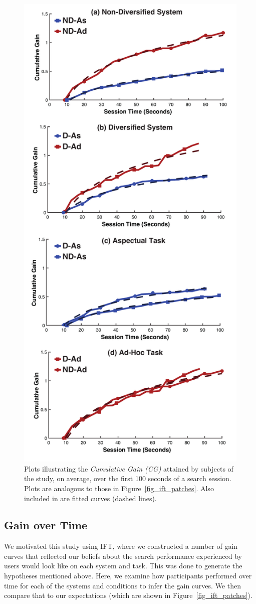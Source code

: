 \begin{figure}[t!]
\includegraphics[width=0.8\linewidth]{figures/cg-new.pdf}
\caption{Plots illustrating the \emph{Cumulative Gain (CG)} attained by subjects of the study, on average, over the first 100 seconds of a search session. Plots are analogous to those in Figure~\ref{fig_ift_patches}. Also included in are fitted curves (dashed lines).} \label{fig_cg}
\end{figure}

\subsection{Gain over Time}
We motivated this study using IFT, where we constructed a number of gain curves that reflected our beliefs about the search performance experienced by users would look like on each system and task. This was done to generate the hypotheses mentioned above. Here, we examine how participants performed over time for each of the systems and conditions to infer the gain curves. We then compare that to our expectations (which are shown in Figure~\ref{fig_ift_patches}).

